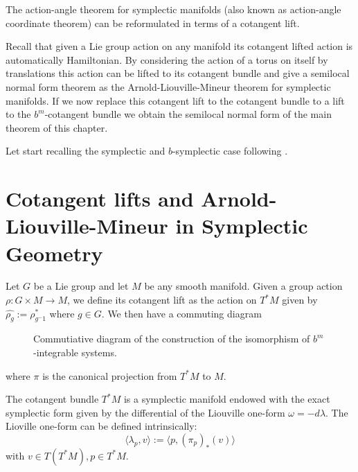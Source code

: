 The action-angle theorem for symplectic manifolds (also known as action-angle coordinate theorem) can be reformulated in terms of a cotangent lift.


Recall that given a Lie group action on any manifold its cotangent lifted action is automatically Hamiltonian. By considering the action of a torus on itself by translations this action can be lifted to its cotangent bundle and give a semilocal normal form theorem as the Arnold-Liouville-Mineur theorem for symplectic manifolds. If we now replace this cotangent lift to the cotangent bundle to a lift to the $b^m$-cotangent bundle we obtain the semilocal normal form of the main theorem of this chapter.


Let start recalling the symplectic and $b$-symplectic case following \cite{KM17}.


\section{Cotangent lifts and Arnold-Liouville-Mineur in Symplectic Geometry}

Let $G$ be a Lie group and let $M$ be any smooth manifold. Given a group action $\rho:G\times M\longrightarrow M$, we define its cotangent lift as the action on $T^\ast M$ given by $\hat{\rho_g}:=\rho^\ast_{g^-1}$ where $g\in G$. We then have a commuting diagram





\begin{figure}[h]
\centering
{}
\caption{Commutiative diagram of the construction of the isomorphism of $b^m$-integrable systems.}
\label{fig:diagram_cotangent_lift}
\end{figure}

where $\pi$ is the canonical projection from $T^\ast M$ to $M$.

 The cotangent bundle $T^*M$ is a symplectic manifold endowed
with the exact symplectic form given by the differential of the Liouville one-form $\omega=-d\lambda$. The Lioville one-form can be defined intrinsically:
\begin{equation}\label{liouvilleform}
 \langle \lambda_p, v\rangle:= \langle p, (\pi_p)_\ast (v)\rangle
\end{equation}
with  $v\in T(T^*M), p\in T^*M$.

